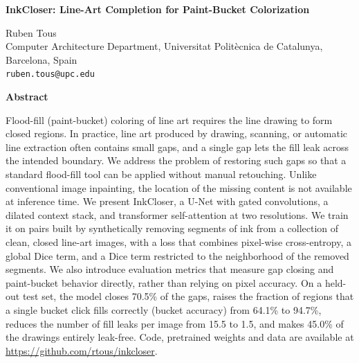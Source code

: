 \documentclass[12pt]{article}
\begin{document}
\begin{center}
{\Large\bfseries InkCloser: Line-Art Completion for Paint-Bucket Colorization\par}
\vspace{1em}
Ruben Tous\\
Computer Architecture Department, Universitat Polit\`ecnica de Catalunya, Barcelona, Spain\\
\texttt{ruben.tous@upc.edu}
\end{center}
\vspace{1.5em}
\noindent\textbf{Abstract}\par\medskip
\noindent Flood-fill (paint-bucket) coloring of line art requires the line drawing to form closed
regions. In practice, line art produced by drawing, scanning, or automatic line extraction
often contains small gaps, and a single gap lets the fill leak across the intended
boundary. We address the problem of restoring such gaps so that a
standard flood-fill tool can be applied without manual retouching. Unlike conventional
image inpainting, the location of the missing content is not available at inference
time. We present InkCloser, a U-Net with gated convolutions, a dilated
context stack, and transformer self-attention at two resolutions. We train it on pairs
built by synthetically removing segments of ink from a collection of clean, closed line-art
images, with a loss that combines pixel-wise cross-entropy, a global Dice term, and
a Dice term restricted to the neighborhood of the removed segments.
We also introduce evaluation metrics that measure gap closing and paint-bucket
behavior directly, rather than relying on pixel accuracy. On a held-out test set, the model closes 70.5\% of the gaps, raises the fraction of
regions that a single bucket click fills correctly (bucket accuracy) from 64.1\% to 94.7\%, reduces
the number of fill leaks per image from 15.5 to 1.5, and makes 45.0\% of the drawings
entirely leak-free. Code, pretrained weights and data are available at \url{https://github.com/rtous/inkcloser}.
\end{document}
